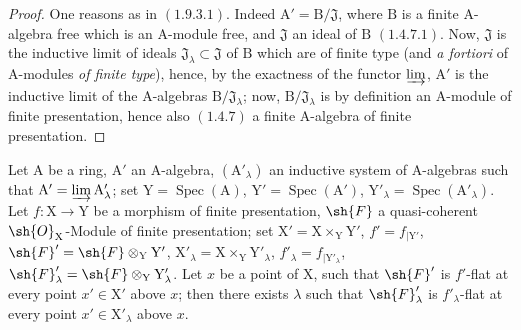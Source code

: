 \begin{proof}
One reasons as in $(1.9.3.1)$. Indeed $\mathrm{A}'=\mathrm{B}/\mathfrak{J}$, where $\mathrm{B}$ is a finite $\mathrm{A}$-algebra
free which is an $\mathrm{A}$-module free, and $\mathfrak{J}$ an ideal of $\mathrm{B}$ $(1.4.7.1)$. Now, $\mathfrak{J}$ is the inductive
limit of ideals $\mathfrak{J}_\lambda\subset\mathfrak{J}$ of $\mathrm{B}$ which are of finite type (and \emph{a fortiori} of $\mathrm{A}$-modules \emph{of finite type}), hence,
by the exactness of the functor $\varinjlim$, $\mathrm{A}'$ is the inductive limit of the $\mathrm{A}$-algebras $\mathrm{B}/\mathfrak{J}_\lambda$; now, $\mathrm{B}/\mathfrak{J}_\lambda$
is by definition an $\mathrm{A}$-module of finite presentation, hence also $(1.4.7)$ a finite $\mathrm{A}$-algebra
of finite presentation.
\end{proof}

\begin{lemma}[11.5.5.2]
\label{IV.11.5.5.2}
Let $\mathrm{A}$ be a ring, $\mathrm{A}'$ an $\mathrm{A}$-algebra, $(\mathrm{A}'_\lambda)$ an inductive system
of $\mathrm{A}$-algebras such that $\mathrm{A}'=\varinjlim\mathrm{A}'_\lambda$; set $\mathrm{Y}=\operatorname{Spec}(\mathrm{A})$, $\mathrm{Y}'=\operatorname{Spec}(\mathrm{A}')$, $\mathrm{Y}'_\lambda=\operatorname{Spec}(\mathrm{A}'_\lambda)$.
Let $f:\mathrm{X}\to\mathrm{Y}$ be a morphism of finite presentation, $\sh{F}$ a quasi-coherent $\sh{O}_\mathrm{X}$-Module of finite
presentation; set $\mathrm{X}'=\mathrm{X}\times_\mathrm{Y}\mathrm{Y}'$, $f'=f_{|\mathrm{Y}'}$, $\sh{F}'=\sh{F}\otimes_\mathrm{Y}\mathrm{Y}'$, $\mathrm{X}'_\lambda=\mathrm{X}\times_\mathrm{Y}\mathrm{Y}'_\lambda$, $f'_\lambda=f_{|\mathrm{Y}'_\lambda}$,
$\sh{F}'_\lambda=\sh{F}\otimes_\mathrm{Y}\mathrm{Y}'_\lambda$. Let $x$ be a point of $\mathrm{X}$, such that $\sh{F}'$ is $f'$-flat at every point $x'\in\mathrm{X}'$ above $x$;
then there exists $\lambda$ such that $\sh{F}'_\lambda$ is $f'_\lambda$-flat at every point $x'\in\mathrm{X}'_\lambda$ above $x$.
\end{lemma}

